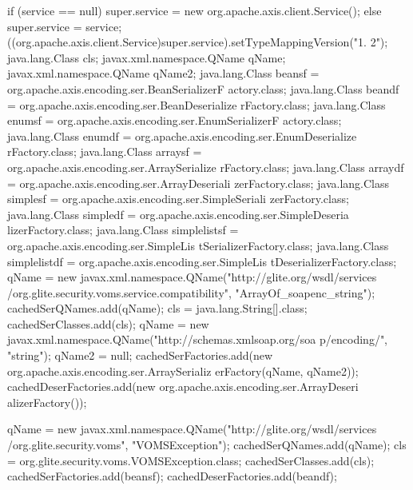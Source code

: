 \begin{DoxyCode}
                                                                                 
                                 {
        if (service == null) {
            super.service = new org.apache.axis.client.Service();
        } else {
            super.service = service;
        }
        ((org.apache.axis.client.Service)super.service).setTypeMappingVersion("1.
      2");
            java.lang.Class cls;
            javax.xml.namespace.QName qName;
            javax.xml.namespace.QName qName2;
            java.lang.Class beansf = org.apache.axis.encoding.ser.BeanSerializerF
      actory.class;
            java.lang.Class beandf = org.apache.axis.encoding.ser.BeanDeserialize
      rFactory.class;
            java.lang.Class enumsf = org.apache.axis.encoding.ser.EnumSerializerF
      actory.class;
            java.lang.Class enumdf = org.apache.axis.encoding.ser.EnumDeserialize
      rFactory.class;
            java.lang.Class arraysf = org.apache.axis.encoding.ser.ArraySerialize
      rFactory.class;
            java.lang.Class arraydf = org.apache.axis.encoding.ser.ArrayDeseriali
      zerFactory.class;
            java.lang.Class simplesf = org.apache.axis.encoding.ser.SimpleSeriali
      zerFactory.class;
            java.lang.Class simpledf = org.apache.axis.encoding.ser.SimpleDeseria
      lizerFactory.class;
            java.lang.Class simplelistsf = org.apache.axis.encoding.ser.SimpleLis
      tSerializerFactory.class;
            java.lang.Class simplelistdf = org.apache.axis.encoding.ser.SimpleLis
      tDeserializerFactory.class;
            qName = new javax.xml.namespace.QName("http://glite.org/wsdl/services
      /org.glite.security.voms.service.compatibility", "ArrayOf_soapenc_string");
            cachedSerQNames.add(qName);
            cls = java.lang.String[].class;
            cachedSerClasses.add(cls);
            qName = new javax.xml.namespace.QName("http://schemas.xmlsoap.org/soa
      p/encoding/", "string");
            qName2 = null;
            cachedSerFactories.add(new org.apache.axis.encoding.ser.ArraySerializ
      erFactory(qName, qName2));
            cachedDeserFactories.add(new org.apache.axis.encoding.ser.ArrayDeseri
      alizerFactory());

            qName = new javax.xml.namespace.QName("http://glite.org/wsdl/services
      /org.glite.security.voms", "VOMSException");
            cachedSerQNames.add(qName);
            cls = org.glite.security.voms.VOMSException.class;
            cachedSerClasses.add(cls);
            cachedSerFactories.add(beansf);
            cachedDeserFactories.add(beandf);

    }
\end{DoxyCode}


